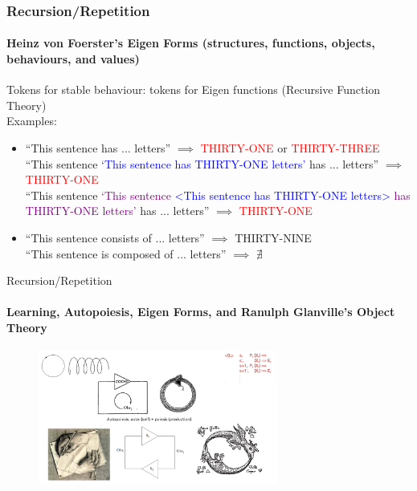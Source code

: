 \documentclass[
	11pt,
	aspectratio=169,
]{beamer}
\begin{document}
                \begin{frame}
                    \frametitle{Recursion/Repetition}
                    \framesubtitle{Heinz von Foerster's Eigen Forms (structures, functions, objects, behaviours, and values)}
                    Tokens for stable behaviour: tokens for Eigen functions (Recursive Function Theory)\\
                    Examples:
                    \begin{itemize}
                        \item<1-> ``This sentence has ... letters'' $\implies$ \textcolor{red}{THIRTY-ONE} or \textcolor{red}{THIRTY-THREE}\\
                        ``This sentence \textcolor{blue}{`This sentence has THIRTY-ONE letters'} has ... letters'' $\implies$ \textcolor{red}{THIRTY-ONE}\\
                        ``This sentence \textcolor{purple}{`This sentence \textcolor{blue}{<This sentence has THIRTY-ONE letters>} has THIRTY-ONE letters'} has ... letters'' $\implies$ \textcolor{red}{THIRTY-ONE} \\
                        \vspace{0.7cm}
                        \item<2-> ``This sentence consists of ... letters'' $\implies$ THIRTY-NINE \\
                        ``This sentence is composed of ... letters'' $\implies$ $\nexists$
                    \end{itemize}
                \end{frame}
                \begin{frame}{Recursion/Repetition}
                    \framesubtitle{Learning, Autopoiesis, Eigen Forms, and Ranulph Glanville's Object Theory}
                    \begin{figure}
                        \centering\includegraphics[width=0.7\textwidth]{resources/recursion.png}
                    \end{figure}
                \end{frame}
\end{document}

